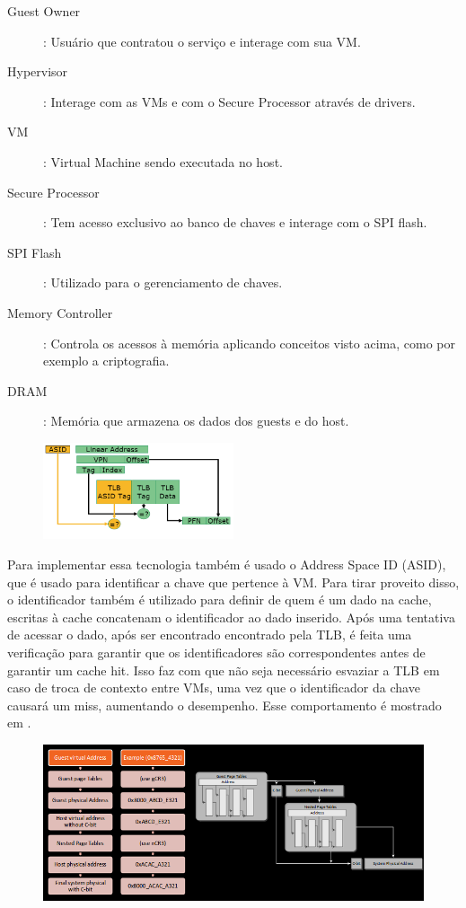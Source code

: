 \documentclass{report}
\begin{document}
\begin{description}
    \item[Guest Owner]: Usuário que contratou o serviço e interage com sua VM.
    \item[Hypervisor]: Interage com as VMs e com o Secure Processor através de
    drivers.
    \item[VM]: Virtual Machine sendo executada no host.
    \item[Secure Processor]: Tem acesso exclusivo ao banco de chaves e interage
    com o SPI flash.
    \item[SPI Flash]: Utilizado para o gerenciamento de chaves.
    \item[Memory Controller]: Controla os acessos à memória aplicando
    conceitos visto acima, como por exemplo a criptografia.
    \item[DRAM]: Memória que armazena os dados dos guests e do host.
\end{description}

\begin{figure}[h]
    \centering
    \includegraphics[width=0.5\textwidth]{img/asid}
    \label{asid}
\end{figure}

Para implementar essa tecnologia também é usado o Address Space ID (ASID), que
é usado para identificar a chave que pertence à VM. Para tirar proveito disso, o identificador
também é utilizado para definir de quem é um dado na cache, escritas à cache
concatenam o identificador ao dado inserido. Após uma tentativa de acessar o dado, após ser encontrado
encontrado pela TLB, é feita uma verificação para garantir que os
identificadores são correspondentes antes de garantir um cache hit. Isso faz
com que não seja necessário esvaziar a TLB em caso de troca de contexto entre
VMs, uma vez que o identificador da chave causará um miss, aumentando
o desempenho. Esse comportamento é mostrado em \label{asid}.

\begin{figure}[h]
    \centering
    \includegraphics[width=1\textwidth]{img/sev-address-translation}
    \label{sev-address-translation}
\end{figure}
\end{document}
